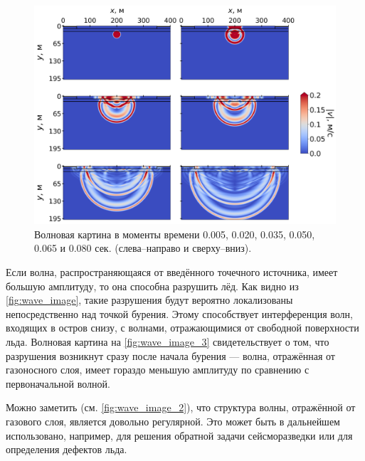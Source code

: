 \begin{figure}[H]
    \centering
    \includegraphics[width=\textwidth]{images/gas_field/wave_pic_1.png}
    \caption{Волновая картина в моменты времени 0.005, 0.020, 0.035, 0.050, 0.065 и 0.080 сек. (слева--направо и сверху--вниз).}
    \label{fig:wave_image}
\end{figure}

Если волна, распространяющаяся от введённого точечного источника, имеет большую амплитуду, то она способна разрушить лёд. Как видно из \autoref{fig:wave_image}, такие разрушения будут вероятно локализованы непосредственно над точкой бурения. Этому способствует интерференция волн, входящих в остров снизу, с волнами, отражающимися от свободной поверхности льда. Волновая картина на \autoref{fig:wave_image_3} свидетельствует о том, что разрушения возникнут сразу после начала бурения --- волна, отражённая от газоносного слоя, имеет гораздо меньшую амплитуду по сравнению с первоначальной волной.

Можно заметить (см. \autoref{fig:wave_image_2}), что структура волны, отражённой от газового слоя, является довольно регулярной. Это может быть в дальнейшем использовано, например, для решения обратной задачи сейсморазведки или для определения дефектов льда.

